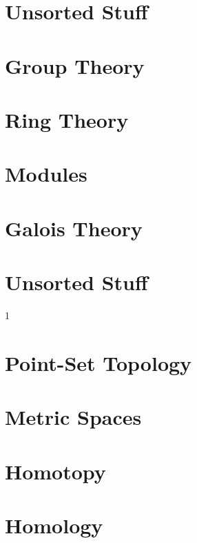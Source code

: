 \documentclass{book}                                                           %
\newcommand*{\TOPPATH}{books}
\newcommand*{\PATH}{\TOPPATH/}
\newcounter{endpage}
\def\compiletopology{0}
\begin{document}
        \part{Unsorted Stuff}
            
            
            
            
            
    \else
        \part{Group Theory}
        \part{Ring Theory}
        \part{Modules}
        \part{Galois Theory}
        \part{Unsorted Stuff}
    \fi
    \clearpage

    \setcounter{endpage}{\thepage}
    \label{book:Topology}%
    \renewcommand{\PATH}{\TOPPATH/Topology}
    \setcounter{page}{\value{endpage}}

    \if\compiletopology1
        \part{Point-Set Topology}
            
            
        \part{Metric Spaces}
        \part{Homotopy}
            
        \part{Homology}
\end{document}
